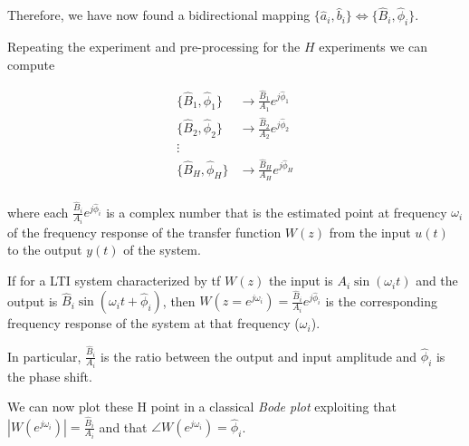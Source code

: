 Therefore, we have now found a bidirectional mapping $ \{ \hat{a}_i, \hat{b}_i \} \iff \{ \hat{B}_i, \hat{\phi}_i \}$.

Repeating the experiment and pre-processing for the $H$ experiments we can compute 

\begin{align*}
    \{ \hat{B}_1, \hat{\phi}_1 \} &\rightarrow \frac{\hat{B}_1}{A_1} e^{j\hat{\phi}_1} \\
    \{ \hat{B}_2, \hat{\phi}_2 \} &\rightarrow \frac{\hat{B}_2}{A_2} e^{j\hat{\phi}_2} \\
    \vdots& \\
    \{ \hat{B}_H, \hat{\phi}_H \} &\rightarrow \frac{\hat{B}_H}{A_H} e^{j\hat{\phi}_H} \\
\end{align*}

where each $\frac{\hat{B}_i}{A_i} e^{j\hat{\phi}_i}$ is a complex number that is the estimated point at frequency $\omega_i$ of the frequency response of the transfer function $W(z)$ from the input $u(t)$ to the output $y(t)$ of the system.

\begin{remark}
    If for a LTI system characterized by \gls{tf} $W(z)$ the input is $A_i \sin (\omega_i t)$ and the output is $\hat{B}_i \sin (\omega_i t + \hat{\phi}_i)$, then $W(z=e^{j \omega_i}) = \frac{\hat{B}_i}{A_i} e^{j\hat{\phi}_i}$ is the corresponding frequency response of the system at that frequency ($\omega_i$).
    
    In particular, $\frac{\hat{B}_i}{A_i}$ is the ratio between the output and input amplitude and $\hat{\phi}_i$ is the phase shift.
\end{remark}

We can now plot these H point in a classical \emph{Bode plot} exploiting that $|W(e^{j \omega_i})| = \frac{\hat{B}_i}{A_i}$ and that $\angle W(e^{j \omega_i}) = \hat{\phi}_i$.

\begin{figure}[H]
    \centering
\end{figure}

